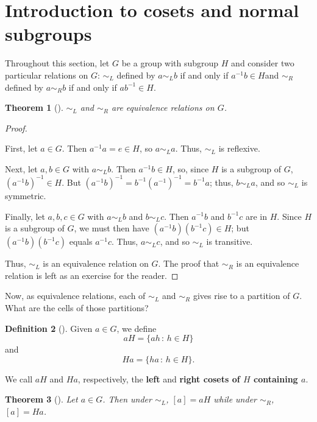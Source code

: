 \documentclass[10pt,]{book}
\newcommand{\terminology}[1]{\textbf{#1}}
\theoremstyle{plain}
\newtheorem{theorem}{Theorem}[section]
\theoremstyle{definition}
\newtheorem{definition}[theorem]{Definition}
\theoremstyle{definition}
\theoremstyle{definition}
\theoremstyle{definition}
\numberwithin{equation}{section}
\def\siml{\sim_L}
\def\simr{\sim_R}
\begin{document}
\section[{Introduction to cosets and normal subgroups}]{Introduction to cosets and normal subgroups}\label{section-23}
Throughout this section, let \(G\) be a group with subgroup \(H\) and consider two particular relations on \(G\): \(\siml\) defined by \(a\siml b\) if and only if \(a^{-1}b\in H\)and \(\simr\) defined by \(a\simr b\) if and only if \(ab^{-1}\in H\).%
\begin{theorem}[{}]\label{simlreq}
\(\siml\) and \(\simr\) are equivalence relations on \(G\).%
\end{theorem}
\begin{proof}\hypertarget{proof-37}{}
First, let \(a\in G\). Then \(a^{-1}a=e\in H\), so \(a\siml a\). Thus, \(\siml\) is reflexive.%
\par
Next, let \(a,b\in G\) with \(a\siml b\). Then \(a^{-1}b\in H\), so, since \(H\) is a subgroup of \(G\), \((a^{-1}b)^{-1}\in H\). But \((a^{-1}b)^{-1}=b^{-1}(a^{-1})^{-1}=b^{-1}a\); thus, \(b\siml a\), and so \(\siml\) is symmetric.%
\par
Finally, let \(a,b,c\in G\) with \(a\siml b\) and \(b\siml c\). Then \(a^{-1}b\) and \(b^{-1}c\) are in \(H\). Since \(H\) is a subgroup of \(G\), we must then have \((a^{-1}b)(b^{-1}c)\in H\); but \((a^{-1}b)(b^{-1}c)\) equals \(a^{-1}c\). Thus, \(a\siml c\), and so \(\siml\) is transitive.%
\par
Thus, \(\siml\) is an equivalence relation on \(G\). The proof that \(\simr\) is an equivalence relation is left as an exercise for the reader.%
\end{proof}
Now, as equivalence relations, each of \(\siml\) and \(\simr\) gives rise to a partition of \(G\). What are the cells of those partitions?%
\begin{definition}[{}]\label{definition-59}
Given \(a\in G\), we define%
\begin{equation*}
aH =
\{ah\,:\, h\in H\}
\end{equation*}
and%
\begin{equation*}
Ha=\{ha\,:\,h\in H\}.
\end{equation*}
%
\par
We call \(aH\) and \(Ha\), respectively, the \terminology{left} and \terminology{right cosets of \(H\) containing \(a\)}.%
\end{definition}
\begin{theorem}[{}]\label{equivca}
Let \(a\in G\). Then under \(\siml\), \([a]=aH\) while under \(\simr\), \([a]=Ha\).%
\end{theorem}
\end{document}
